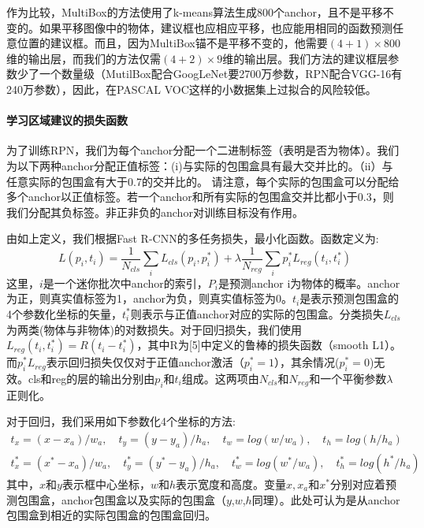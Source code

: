 \documentclass[12pt,a4paper,titlepage]{article}
\begin{document}
作为比较，MultiBox的方法使用了k-means算法生成800个anchor，且不是平移不变的。如果平移图像中的物体，建议框也应相应平移，也应能用相同的函数预测任意位置的建议框。而且，因为MultiBox锚不是平移不变的，他需要$(4+1) \times    800$维的输出层，而我们的方法仅需$(4+2) \times 9$维的输出层。我们方法的建议框层参数少了一个数量级（MutilBox配合GoogLeNet要2700万参数，RPN配合VGG-16有240万参数），因此，在PASCAL VOC这样的小数据集上过拟合的风险较低。

\paragraph{学习区域建议的损失函数}
为了训练RPN，我们为每个anchor分配一个二进制标签（表明是否为物体）。我们为以下两种anchor分配正值标签：(i)与实际的包围盒具有最大交并比的。（ii）与任意实际的包围盒有大于0.7的交并比的。 请注意，每个实际的包围盒可以分配给多个anchor以正值标签。若一个anchor和所有实际的包围盒交并比都小于0.3，则我们分配其负标签。非正非负的anchor对训练目标没有作用。\par

由如上定义，我们根据Fast R-CNN的多任务损失，最小化函数。函数定义为:
\begin{equation}
L({p_i},{t_i})=\frac{1}{N_{cls}}\sum_iL_{cls}(p_i,p_i^*)+\lambda\frac{1}{N_{reg}}\sum_ip_i^*L_{reg}(t_i,t_i^*  )
\end{equation}
这里，$i$是一个迷你批次中anchor的索引，$P_i$是预测anchor i为物体的概率。anchor为正，则真实值标签为1，anchor为负，则真实值标签为0。$t_i$是表示预测包围盒的4个参数化坐标的矢量，$t_i^*$则表示与正值anchor对应的实际的包围盒。分类损失$L_{cls}$为两类(物体与非物体)的对数损失。对于回归损失，我们使用$L_{reg}(t_i,t_i^*)=R(t_i-t_i^*)$，其中R为[5]中定义的鲁棒的损失函数（smooth L1）。而$p_i^*L_{reg}$表示回归损失仅仅对于正值anchor激活（$p_i^*=1$），其余情况($p_i^*=0$)无效。cls和reg的层的输出分别由{$p_i$}和{$t_i$}组成。这两项由$N_{cls}$和$N_{reg}$和一个平衡参数$\lambda$正则化。\par

对于回归，我们采用如下参数化4个坐标的方法:
\[
\begin{split}
t_x = (x-x_a)/w_a,\quad t_y = (y-y_a)/h_a,\quad t_w = log(w/w_a),\quad t_h = log(h/h_a)\\
t_x^* = (x^*-x_a)/w_a,\quad t_y^* = (y^*-y_a)/h_a,\quad t_w^* = log(w^*/w_a),\quad t_h^* = log(h^*/h_a)
\end{split}
\]
其中，$x$和$y$表示框中心坐标，$w$和$h$表示宽度和高度。变量$x,x_a$和$x^*$分别对应着预测包围盒，anchor包围盒以及实际的包围盒（$y$,$w$,$h$同理）。此处可认为是从anchor包围盒到相近的实际包围盒的包围盒回归。\par
\end{document}
